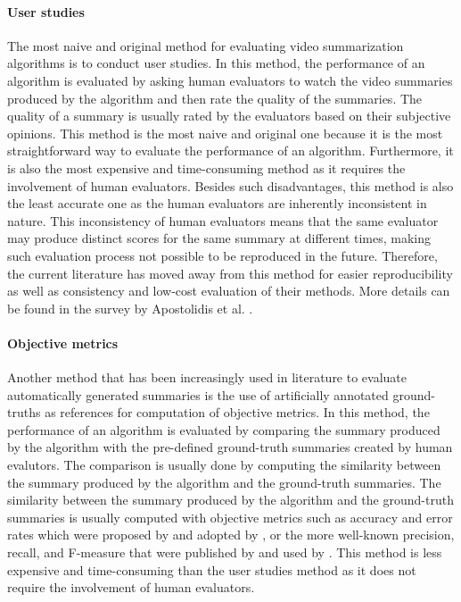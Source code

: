 		\paragraph[short]{User studies}
			The most naive and original method for evaluating video summarization algorithms is to conduct user studies. In this method, the performance of an algorithm is evaluated by asking human evaluators to watch the video summaries produced by the algorithm and then rate the quality of the summaries. The quality of a summary is usually rated by the evaluators based on their subjective opinions. This method is the most naive and original one because it is the most straightforward way to evaluate the performance of an algorithm. Furthermore, it is also the most expensive and time-consuming method as it requires the involvement of human evaluators. Besides such disadvantages, this method is also the least accurate one as the human evaluators are inherently inconsistent in nature. This inconsistency of human evaluators means that the same evaluator may produce distinct scores for the same summary at different times, making such evaluation process not possible to be reproduced in the future. Therefore, the current literature has moved away from this method for easier reproducibility as well as consistency and low-cost evaluation of their methods. More details can be found in the survey by Apostolidis et al. \cite{Apostolidis2021Video}.

		\paragraph[short]{Objective metrics}
			Another method that has been increasingly used in literature to evaluate automatically generated summaries is the use of artificially annotated ground-truths as references for computation of objective metrics. In this method, the performance of an algorithm is evaluated by comparing the summary produced by the algorithm with the pre-defined ground-truth summaries created by human evalutors. The comparison is usually done by computing the similarity between the summary produced by the algorithm and the ground-truth summaries. The similarity between the summary produced by the algorithm and the ground-truth summaries is usually computed with objective metrics such as accuracy and error rates which were proposed by \cite{ejaz2012adaptive} and adopted by \cite{almeida2012vison,cahuina2013new,jacob2017video}, or the more well-known precision, recall, and F-measure that were published by \cite{mahmoud2013unsupervised} and used by \cite{gong2014diverse,guan2014top,mei2015video,demir2015video}. This method is less expensive and time-consuming than the user studies method as it does not require the involvement of human evaluators.

